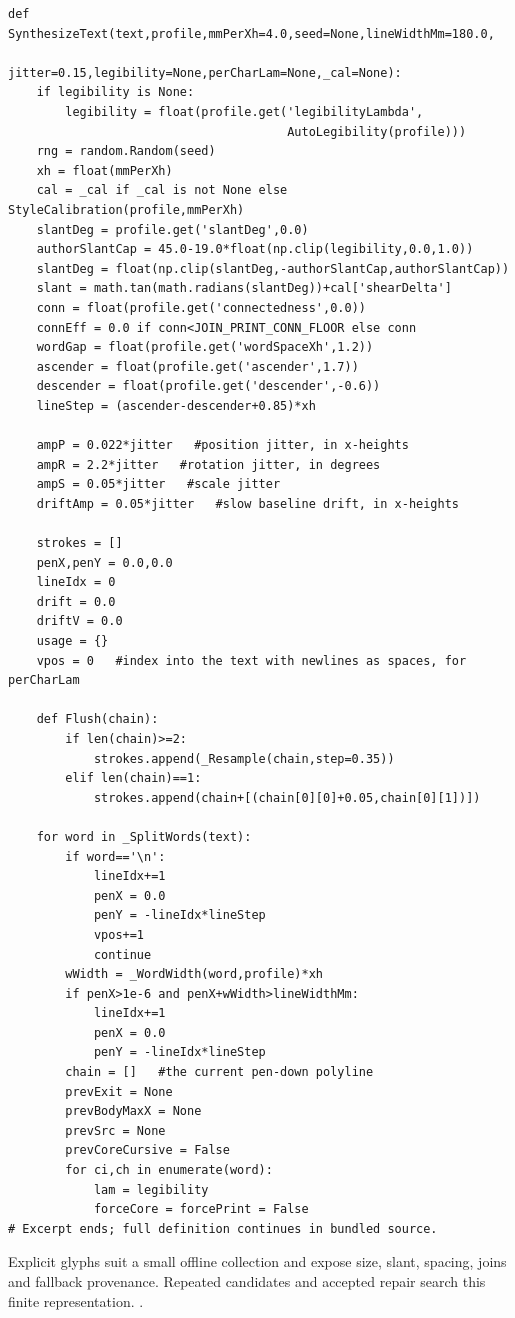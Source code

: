 \begin{lstlisting}[style=plain]
def SynthesizeText(text,profile,mmPerXh=4.0,seed=None,lineWidthMm=180.0,
                   jitter=0.15,legibility=None,perCharLam=None,_cal=None):
    if legibility is None:
        legibility = float(profile.get('legibilityLambda',
                                       AutoLegibility(profile)))
    rng = random.Random(seed)
    xh = float(mmPerXh)
    cal = _cal if _cal is not None else StyleCalibration(profile,mmPerXh)
    slantDeg = profile.get('slantDeg',0.0)
    authorSlantCap = 45.0-19.0*float(np.clip(legibility,0.0,1.0))
    slantDeg = float(np.clip(slantDeg,-authorSlantCap,authorSlantCap))
    slant = math.tan(math.radians(slantDeg))+cal['shearDelta']
    conn = float(profile.get('connectedness',0.0))
    connEff = 0.0 if conn<JOIN_PRINT_CONN_FLOOR else conn
    wordGap = float(profile.get('wordSpaceXh',1.2))
    ascender = float(profile.get('ascender',1.7))
    descender = float(profile.get('descender',-0.6))
    lineStep = (ascender-descender+0.85)*xh

    ampP = 0.022*jitter   #position jitter, in x-heights
    ampR = 2.2*jitter   #rotation jitter, in degrees
    ampS = 0.05*jitter   #scale jitter
    driftAmp = 0.05*jitter   #slow baseline drift, in x-heights

    strokes = []
    penX,penY = 0.0,0.0
    lineIdx = 0
    drift = 0.0
    driftV = 0.0
    usage = {}
    vpos = 0   #index into the text with newlines as spaces, for perCharLam

    def Flush(chain):
        if len(chain)>=2:
            strokes.append(_Resample(chain,step=0.35))
        elif len(chain)==1:
            strokes.append(chain+[(chain[0][0]+0.05,chain[0][1])])

    for word in _SplitWords(text):
        if word=='\n':
            lineIdx+=1
            penX = 0.0
            penY = -lineIdx*lineStep
            vpos+=1
            continue
        wWidth = _WordWidth(word,profile)*xh
        if penX>1e-6 and penX+wWidth>lineWidthMm:
            lineIdx+=1
            penX = 0.0
            penY = -lineIdx*lineStep
        chain = []   #the current pen-down polyline
        prevExit = None
        prevBodyMaxX = None
        prevSrc = None
        prevCoreCursive = False
        for ci,ch in enumerate(word):
            lam = legibility
            forceCore = forcePrint = False
# Excerpt ends; full definition continues in bundled source.
\end{lstlisting}
Explicit glyphs suit a small offline collection and expose size, slant, spacing, joins and fallback provenance. Repeated candidates and accepted repair search this finite representation. \cite{haines2016,gravesgenerate,ganwriting,onedm}.


